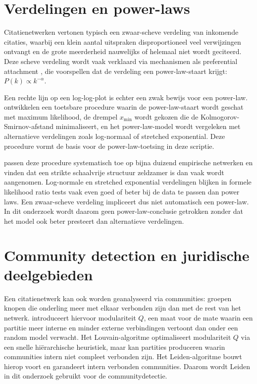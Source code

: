 \documentclass[a4paper, 12pt]{report}
\begin{document}
\section{Verdelingen en power-laws}

Citatienetwerken vertonen typisch een zwaar-scheve verdeling van inkomende citaties, waarbij een klein aantal uitspraken disproportioneel veel verwijzingen ontvangt en de grote meerderheid nauwelijks of helemaal niet wordt geciteerd. Deze scheve verdeling wordt vaak verklaard via mechanismen als preferential attachment \parencite{barabasi1999}, die voorspellen dat de verdeling een power-law-staart krijgt: $P(k) \propto k^{-\alpha}$.

Een rechte lijn op een log-log-plot is echter een zwak bewijs voor een power-law. \textcite{clauset2009} ontwikkelen een toetsbare procedure waarin de power-law-staart wordt geschat met maximum likelihood, de drempel $x_{\min}$ wordt gekozen die de Kolmogorov-Smirnov-afstand minimaliseert, en het power-law-model wordt vergeleken met alternatieve verdelingen zoals log-normaal of stretched exponential. Deze procedure vormt de basis voor de power-law-toetsing in deze scriptie.

\textcite{broido2019} passen deze procedure systematisch toe op bijna duizend empirische netwerken en vinden dat een strikte schaalvrije structuur zeldzamer is dan vaak wordt aangenomen. Log-normale en stretched exponential verdelingen blijken in formele likelihood ratio tests vaak even goed of beter bij de data te passen dan power laws. Een zwaar-scheve verdeling impliceert dus niet automatisch een power-law. In dit onderzoek wordt daarom geen power-law-conclusie getrokken zonder dat het model ook beter presteert dan alternatieve verdelingen.

\section{Community detection en juridische deelgebieden}

Een citatienetwerk kan ook worden geanalyseerd via communities: groepen knopen die onderling meer met elkaar verbonden zijn dan met de rest van het netwerk. \textcite{newman2006} introduceert hiervoor modulariteit $Q$, een maat voor de mate waarin een partitie meer interne en minder externe verbindingen vertoont dan onder een random model verwacht. Het Louvain-algoritme \parencite{blondel2008} optimaliseert modulariteit $Q$ via een snelle hiërarchische heuristiek, maar kan partities produceren waarin communities intern niet compleet verbonden zijn. Het Leiden-algoritme \parencite{traag2019} bouwt hierop voort en garandeert intern verbonden communities. Daarom wordt Leiden in dit onderzoek gebruikt voor de communitydetectie.
\end{document}
